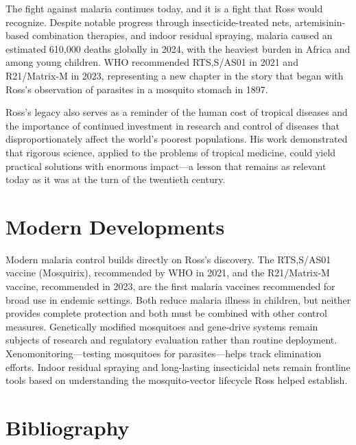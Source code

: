 The fight against malaria continues today, and it is a fight that Ross would recognize. Despite notable progress through insecticide-treated nets, artemisinin-based combination therapies, and indoor residual spraying, malaria caused an estimated 610,000 deaths globally in 2024, with the heaviest burden in Africa and among young children. WHO recommended RTS,S/AS01 in 2021 and R21/Matrix-M in 2023, representing a new chapter in the story that began with Ross's observation of parasites in a mosquito stomach in 1897.\cite{who-malaria}

Ross's legacy also serves as a reminder of the human cost of tropical diseases and the importance of continued investment in research and control of diseases that disproportionately affect the world's poorest populations. His work demonstrated that rigorous science, applied to the problems of tropical medicine, could yield practical solutions with enormous impact---a lesson that remains as relevant today as it was at the turn of the twentieth century.

\section{Modern Developments}

Modern malaria control builds directly on Ross's discovery. The RTS,S/AS01 vaccine (Mosquirix), recommended by WHO in 2021, and the R21/Matrix-M vaccine, recommended in 2023, are the first malaria vaccines recommended for broad use in endemic settings. Both reduce malaria illness in children, but neither provides complete protection and both must be combined with other control measures. Genetically modified mosquitoes and gene-drive systems remain subjects of research and regulatory evaluation rather than routine deployment. Xenomonitoring---testing mosquitoes for parasites---helps track elimination efforts. Indoor residual spraying and long-lasting insecticidal nets remain frontline tools based on understanding the mosquito-vector lifecycle Ross helped establish.\cite{who-malaria}


\section{Bibliography}

